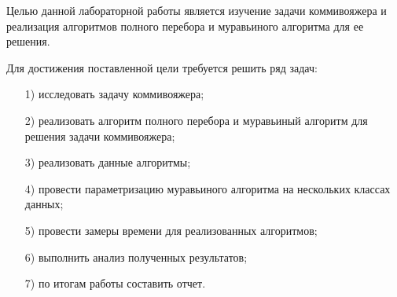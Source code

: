 


Целью данной лабораторной работы является  изучение задачи коммивояжера и реализация алгоритмов
полного перебора и муравьиного алгоритма для ее решения.

Для достижения поставленной цели требуется решить ряд задач:
\begin{enumerate}[itemindent=1em]
	\item[1)] исследовать задачу коммивояжера;
	\item[2)] реализовать алгоритм полного перебора и муравьиный алгоритм для решения задачи коммивояжера;
	\item[3)] реализовать данные алгоритмы;
	\item[4)] провести параметризацию муравьиного алгоритма на нескольких классах данных;
	\item[5)] провести замеры времени для реализованных алгоритмов;
 	\item[6)] выполнить анализ полученных результатов;
	\item[7)] по итогам работы составить отчет.
\end{enumerate}

\newpage
